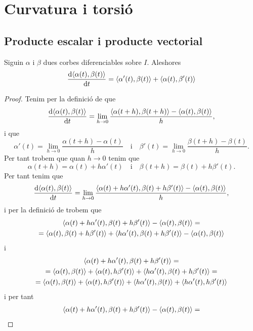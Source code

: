 \documentclass[../../Main.tex]{subfiles}
\begin{document}
\section{Curvatura i torsió}
	\subsection{Producte escalar i producte vectorial}
	\begin{proposition}
		\label{prop:derivada del producte escalar de dues corbes}
		Siguin \(\alpha\) i \(\beta\) dues corbes diferenciables sobre \(I\). Aleshores
		\[
		    \frac{\diff\prodesc{\alpha(t)}{\beta(t)}}{\diff t}=\prodesc{\alpha'(t)}{\beta(t)}+\prodesc{\alpha(t)}{\beta'(t)}
		\]
		\begin{proof}
			Tenim per la definició de  que
			\[
			    \frac{\diff\prodesc{\alpha(t)}{\beta(t)}}{\diff t}=\lim_{h\to0}\frac{\prodesc{\alpha(t+h)}{\beta(t+h)}-\prodesc{\alpha(t)}{\beta(t)}}{h},
			\]
			i que
			\[
			    \alpha'(t)=\lim_{h\to0}\frac{\alpha(t+h)-\alpha(t)}{h}\quad\text{i}\quad\beta'(t)=\lim_{h\to0}\frac{\beta(t+h)-\beta(t)}{h}.
			\]
			Per tant trobem que quan \(h\to0\) tenim que
			\[
			    \alpha(t+h)=\alpha(t)+h\alpha'(t)\quad\text{i}\quad\beta(t+h)=\beta(t)+h\beta'(t).
			\]
			Per tant tenim que
			\[
			    \frac{\diff\prodesc{\alpha(t)}{\beta(t)}}{\diff t}=\lim_{h\to0}\frac{\prodesc{\alpha(t)+h\alpha'(t)}{\beta(t)+h\beta'(t)}-\prodesc{\alpha(t)}{\beta(t)}}{h},
			\]
			i per la definició de  trobem que
			\begin{multline*}
				\prodesc{\alpha(t)+h\alpha'(t)}{\beta(t)+h\beta'(t)}-\prodesc{\alpha(t)}{\beta(t)}=\\
				=\prodesc{\alpha(t)}{\beta(t)+h\beta'(t)}+\prodesc{h\alpha'(t)}{\beta(t)+h\beta'(t)}-\prodesc{\alpha(t)}{\beta(t)}
			\end{multline*}
			i
			\begin{multline*}
				\prodesc{\alpha(t)+h\alpha'(t)}{\beta(t)+h\beta'(t)}=\\
				=\prodesc{\alpha(t)}{\beta(t)}+\prodesc{\alpha(t)}{h\beta'(t)}+\prodesc{h\alpha'(t)}{\beta(t)+h\beta'(t)}=\\
				=\prodesc{\alpha(t)}{\beta(t)}+\prodesc{\alpha(t)}{h\beta'(t)}+\prodesc{h\alpha'(t)}{\beta(t)}+\prodesc{h\alpha'(t)}{h\beta'(t)}
			\end{multline*}
			i per tant
			\begin{multline*}
				\prodesc{\alpha(t)+h\alpha'(t)}{\beta(t)+h\beta'(t)}-\prodesc{\alpha(t)}{\beta(t)}=\\

\end{multline*}
\end{proof}
\end{proposition}
\end{document}
